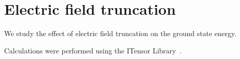 \documentclass[aps,prl,reprint,superscriptaddress, onecolumn, 11pt]{revtex4-2}
\theoremstyle{definition}
\theoremstyle{definition}
\begin{document}
\section{Electric field truncation}
\label{sec:Etruncation}

We study the effect of electric field truncation on the ground state energy.

\begin{acknowledgments}
Calculations were performed using the ITensor Library~\cite{itensor}.
\end{acknowledgments}


\end{document}

